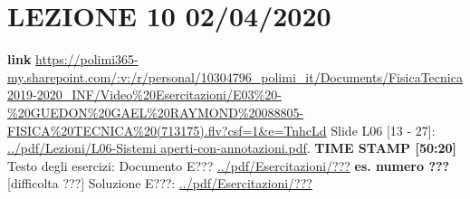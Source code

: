 \section*{LEZIONE 10 02/04/2020}
\textbf{link} \url{https://polimi365-my.sharepoint.com/:v:/r/personal/10304796_polimi_it/Documents/FisicaTecnica2019-2020_INF/Video%20Esercitazioni/E03%20-%20GUEDON%20GAEL%20RAYMOND%20088805-FISICA%20TECNICA%20(713175).flv?csf=1&e=TnhcLd}\newline
\newline
Slide L06 [13 - 27]: \url{../pdf/Lezioni/L06-Sistemi aperti-con-annotazioni.pdf}.\newline
\newline
\textbf{TIME STAMP [50:20]}\newline
\newline
Testo degli esercizi:\newline
Documento E??? \url{../pdf/Esercitazioni/???}\newline
\textbf{es. numero ???} [difficolta ???]\newline
Soluzione E???: \url{../pdf/Esercitazioni/???}

